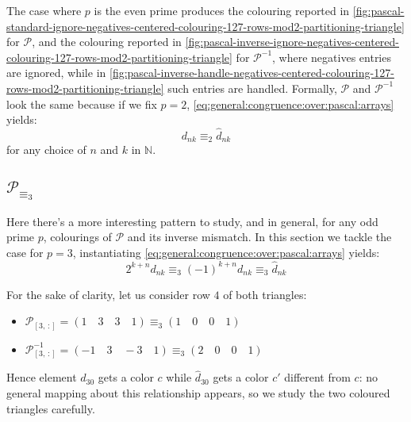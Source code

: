 The case where $p$ is the even prime produces the colouring reported in
\autoref{fig:pascal-standard-ignore-negatives-centered-colouring-127-rows-mod2-partitioning-triangle} for $\mathcal{P}$,
and the colouring reported in
\autoref{fig:pascal-inverse-ignore-negatives-centered-colouring-127-rows-mod2-partitioning-triangle} for $\mathcal{P}^{-1}$,
where negatives entries are ignored, while in 
\autoref{fig:pascal-inverse-handle-negatives-centered-colouring-127-rows-mod2-partitioning-triangle} such entries are handled.
Formally, $\mathcal{P}$ and $\mathcal{P}^{-1}$ look the same because if we fix $p=2$, 
\autoref{eq:general:congruence:over:pascal:arrays} yields:
\begin{displaymath} 
    d_{nk} \equiv_{2} \hat{d}_{nk} 
\end{displaymath} 
for any choice of $n$ and $k$ in $\mathbb{N}$.







\subsection{$\mathcal{P}_{\equiv_{3}}$}

Here there's a more interesting pattern to study, and in general,
for any odd prime $p$, colourings of $\mathcal{P}$ and its inverse 
mismatch. In this section we tackle the case for $p=3$,
instantiating \autoref{eq:general:congruence:over:pascal:arrays} yields:
\begin{displaymath}
  2^{k+n}d_{nk}\equiv_{3}(-1)^{k+n}d_{nk} \equiv_{3} \hat{d}_{nk}
\end{displaymath}

For the sake of clarity, let us consider row $4$ of both triangles:
\begin{itemize}
\item $\mathcal{P}_{[3,\,:]} = (1 \quad 3 \quad 3 \quad 1) \equiv_{3}(1 \quad 0 \quad 0 \quad 1)$
\item $\mathcal{P}^{-1}_{[3,\,:]} = (-1 \quad 3 \quad -3 \quad 1) \equiv_{3}(2 \quad 0 \quad 0 \quad 1)$
\end{itemize}
Hence element $d_{30}$ gets a color $c$ while $\hat{d}_{30}$ gets
a color $c'$ different from $c$: no general mapping about this relationship appears, so we
study the two coloured triangles carefully. 

